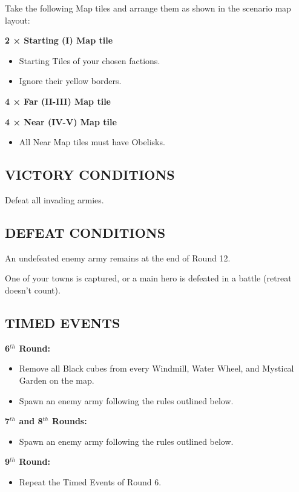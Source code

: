 \begin{multicols}{2}
Take the following Map tiles and arrange them as shown in the scenario map layout:

\textbf{2 × Starting (I) Map tile}
\begin{itemize}
  \item Starting Tiles of your chosen factions.
  \item Ignore their yellow borders.
\end{itemize}

\textbf{4 × Far (II-III) Map tile}

\textbf{4 × Near (IV-V) Map tile}
\begin{itemize}
  \item All Near Map tiles must have Obelisks.
\end{itemize}

\subsection*{\MakeUppercase{Victory Conditions}}

Defeat all invading armies.

\subsection*{\MakeUppercase{Defeat Conditions}}

An undefeated enemy army remains at the end of Round 12.

One of your towns is captured, or a main hero is defeated in a battle (retreat doesn't count).

\subsection*{\MakeUppercase{Timed Events}}

\textbf{6$^{th}$ Round:}
\begin{itemize}
  \item Remove all Black cubes from every Windmill, Water Wheel, and Mystical Garden on the map.
  \item Spawn an enemy army following the rules outlined below.
\end{itemize}

\textbf{7$^{th}$ and 8$^{th}$ Rounds:}
\begin{itemize}
  \item Spawn an enemy army following the rules outlined below.
\end{itemize}

\textbf{9$^{th}$ Round:}
\begin{itemize}
  \item Repeat the Timed Events of Round 6.
\end{itemize}


\end{multicols}
